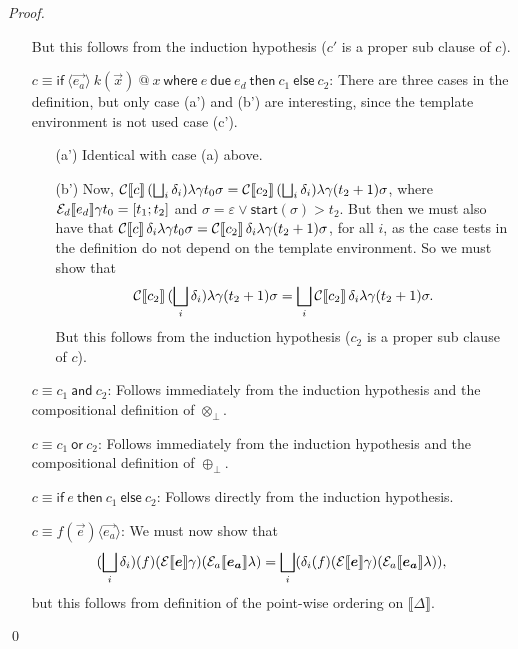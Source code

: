 \documentclass[orivec,final]{llncs-href}
\makeatletter
\newcommand{\dendom}[1]{\llbracket #1 \rrbracket}
\newcommand{\tracestart}{\mathsf{start}}
\newcommand{\trace}{\sigma}
\newcommand{\emptytrace}{\varepsilon}
\newcommand{\catomicp}[7]{\mathsf{if}\ \langle#1\rangle\ #2\ \textsf{@}\ #3\
  \mathsf{where}\ #4\ \mathsf{due}\ #5\ \mathsf{then}\ #6\
  \mathsf{else}\ #7}
\newcommand{\cand}[2]{#1\ \mathsf{and}\ #2}
\newcommand{\cor}[2]{#1\ \mathsf{or}\ #2}
\newcommand{\cifthenelse}[3]{\mathsf{if}\ #1\ \mathsf{then}\ #2\
  \mathsf{else}\ #3}
\newcommand{\cinstantiate}[3]{#1(#2)\langle#3\rangle}
\newcommand{\canddefault}{\cand{c_1}{c_2}}
\newcommand{\cordefault}{\cor{c_1}{c_2}}
\newcommand{\cifthenelsedefault}{\cifthenelse{e}{c_1}{c_2}}
\newcommand{\cinstantiatedefault}{\cinstantiate{f}{\vec{e}}{\vec{e_a}}}
\makeatother
\begin{document}
\begin{proof}
\begin{itemize}
    But this follows from the induction hypothesis ($c'$ is a proper
    sub clause of $c$).
  \item[$c \equiv \catomicp{\vec{e_a}}{k(\vec{x})}{x}{e}{e_d}{c_1}{c_2}$:]
    There are three cases in the definition, but only case (a') and (b')
    are interesting, since the template environment is not used case
    (c').
    \begin{itemize}
    \item[(a')] Identical with case (a) above.
    \item[(b')] Now, $\cdenclause{c}{(\bigsqcup_i
        \delta_i)}{\lambda}{\gamma}{t_0}{\trace} = 
      \cdenclause{c_2}{(\bigsqcup_i
        \delta_i)}{\lambda}{\gamma}{(t_2+1)}{\trace}$, where
      $\mathcal{E}_d\llbracket e_d \rrbracket \gamma t_0 = [t_1;t_2]$ and
      $\trace = \emptytrace \lor \tracestart(\trace) > t_2$. But then we
      must also have that
      $\cdenclause{c}{\delta_i}{\lambda}{\gamma}{t_0}{\trace} =
      \cdenclause{c_2}{\delta_i}{\lambda}{\gamma}{(t_2+1)}{\trace}$,
      for all $i$, as the case tests in the definition do not depend
      on the template environment. So we
      must show that
      \[
      \cdenclause{c_2}{(\bigsqcup_i \delta_i)}{\lambda}{\gamma}{(t_2+1)}{\trace}
      = \bigsqcup_i
      \cdenclause{c_2}{\delta_i}{\lambda}{\gamma}{(t_2+1)}{\trace}.
      \]
      But this follows from the induction hypothesis ($c_2$ is a proper
      sub clause of $c$).
    \end{itemize}
  \item[$c \equiv \canddefault$:]
    Follows immediately from the induction hypothesis and the
    compositional definition of $\otimes_\bot$.
  \item[$c \equiv \cordefault$:]
    Follows immediately from the induction hypothesis and the
    compositional definition of $\oplus_\bot$.
  \item[$c \equiv \cifthenelsedefault$:]
    Follows directly from the induction hypothesis.
  \item[$c \equiv \cinstantiatedefault$:]
    We must now show that
    \[
    (\bigsqcup_i \delta_i)(f)(\cdenexp{\vec{e}}{\gamma})(\cdenaexp{\vec{e_a}}{\lambda})
    = \bigsqcup_i
    (\delta_i(f)(\cdenexp{\vec{e}}{\gamma})(\cdenaexp{\vec{e_a}}{\lambda})),
    \]
    but this follows from definition of the point-wise ordering on
    $\dendom{\Delta}$.
  \end{itemize}
  \qed
\end{proof}
\end{document}
